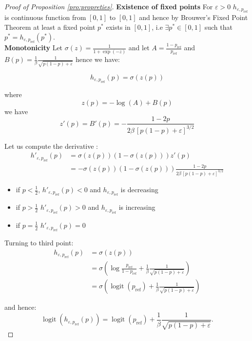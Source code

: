 \documentclass[11pt,reqno]{amsart}
\DeclareMathOperator{\logit}{logit}
\begin{document}
\begin{proof}[Proof of Proposition \ref{pro:propreties}]

\noindent \textbf{Existence of fixed points} For $\varepsilon >0$ $h_{\varepsilon,p_{\mathrm{ref}}}$ is continuous function from \([0,1]\) to \([0,1]\)  and hence by Brouwer's Fixed Point Theorem at least a fixed point $p^*$ exists in $[0,1]$, i.e $\exists p^* \in [0,1]$ such that $p^* = h_{\varepsilon, p_{\mathrm{ref}}} (p^*)$.\\

\noindent \textbf{Monotonicity} Let $\sigma(z) = \frac{1}{1+ \exp(-z)}$ and let $A = \frac{1-p_{\mathrm{ref}}}{p_{\mathrm{ref}}}  $ and $B(p) = \frac{1}{\beta}  \frac{1}{\sqrt{p(1-p) + \varepsilon}}$ hence we have:

\[ h_{\varepsilon, p_{\mathrm{ref}}} (p) = \sigma\left( z(p) \right)\]



\noindent where $$z(p) = - \log(A) + B(p)  $$
we have $$z'(p) =   B'(p) = -\frac{1-2p}{2\beta\,[p(1-p)+\varepsilon]^{3/2}}  $$

\noindent Let us compute the derivative : 
\begin{align*}
h'_{\varepsilon,p_{\mathrm{ref}}}(p) & = \sigma(z(p)) (1-\sigma(z(p))) z'(p)\\
& = - \sigma(z(p)) (1-\sigma(z(p)))  \frac{1-2p}{2\beta\,[p(1-p)+\varepsilon]^{3/2}}
\end{align*}

\begin{itemize}
\item if $p<\frac{1}{2}$, $h'_{\varepsilon,p_{\mathrm{ref}}}(p)<0 $  and $h_{\varepsilon,p_{\mathrm{ref}}}$ is decreasing 
\item if $p>\frac{1}{2}$ $h'_{\varepsilon,p_{\mathrm{ref}}}(p)>0 $  and $h_{\varepsilon,p_{\mathrm{ref}}}$ is increasing 

\item if $p= \frac{1}{2}$ $h'_{\varepsilon,p_{\mathrm{ref}}}(p)= 0 $ 
\end{itemize}
Turning to third point:
\begin{align*}
 h_{\varepsilon, p_{\mathrm{ref}}} (p) &= \sigma\left( z(p) \right)\\
 &= \sigma \left( \log \frac{p_{\mathrm{ref}}}{1-p_{\mathrm{ref} }} + \frac{1}{\beta}  \frac{1}{\sqrt{p(1-p) + \varepsilon}} \right)\\
 & = \sigma\left(\logit (p_{\mathrm{ref}})  + \frac{1}{\beta}  \frac{1}{\sqrt{p(1-p) + \varepsilon}}\right)
 \end{align*}

and hence:
\begin{equation}
    \logit \left( h_{\varepsilon, p_{\mathrm{ref}}} (p)\right) =\logit (p_{\mathrm{ref}})  + \frac{1}{\beta}  \frac{1}{\sqrt{p(1-p) + \varepsilon}}. 
\end{equation}

\end{proof}
\end{document}
